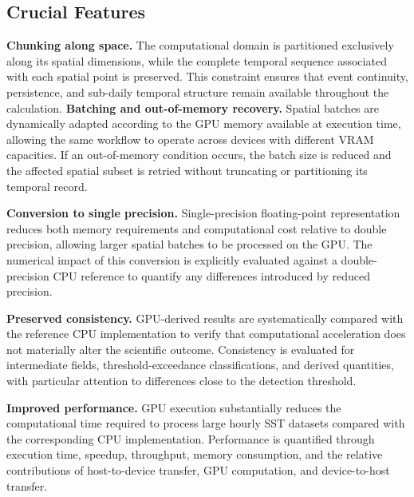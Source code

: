 \subsection{Crucial Features}
\noindent\textbf{Chunking along space.}
The computational domain is partitioned exclusively along its spatial dimensions, while the complete
temporal sequence associated with each spatial point is preserved.
This constraint ensures that event continuity, persistence, and sub-daily temporal structure remain
available throughout the calculation.
\noindent\textbf{Batching and out-of-memory recovery.}
Spatial batches are dynamically adapted according to the GPU memory available at execution time,
allowing the same workflow to operate across devices with different VRAM capacities.
If an out-of-memory condition occurs, the batch size is reduced and the affected spatial subset is
retried without truncating or partitioning its temporal record.

\noindent\textbf{Conversion to single precision.}
Single-precision floating-point representation reduces both memory requirements and computational cost
relative to double precision, allowing larger spatial batches to be processed on the GPU.
The numerical impact of this conversion is explicitly evaluated against a double-precision CPU
reference to quantify any differences introduced by reduced precision.



\noindent\textbf{Preserved consistency.}
GPU-derived results are systematically compared with the reference CPU implementation to verify that
computational acceleration does not materially alter the scientific outcome.
Consistency is evaluated for intermediate fields, threshold-exceedance classifications, and derived
quantities, with particular attention to differences close to the detection threshold.

\noindent\textbf{Improved performance.}
GPU execution substantially reduces the computational time required to process large hourly SST
datasets compared with the corresponding CPU implementation.
Performance is quantified through execution time, speedup, throughput, memory consumption, and the
relative contributions of host-to-device transfer, GPU computation, and device-to-host transfer.


